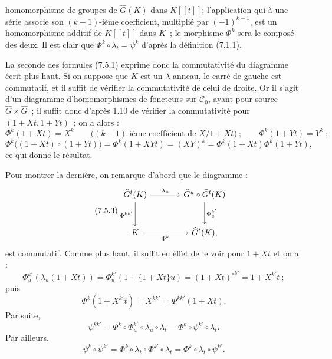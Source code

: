 homomorphisme de groupes de \(\widehat G(K)\) dans \(K[[t]]\); l'application qui à une série associe son \((k-1)\)-ième coefficient, multiplié par \((-1)^{k-1}\), est un homomorphisme additif de \(K[[t]]\) dans \(K\)~; le morphisme \(\Phi^k\) sera le composé des deux. Il est clair que \(\Phi^k\circ\lambda_t=\psi^k\) d'après la définition (7.1.1).

La seconde des formules (7.5.1) exprime donc la commutativité du diagramme écrit plus haut. Si on suppose que \(K\) est un \(\lambda\)-anneau, le carré de gauche est commutatif, et il suffit de vérifier la commutativité de celui de droite. Or il s'agit d'un diagramme d'homomorphismes de foncteurs sur \(\mathcal C_0\), ayant pour source \(\widehat G\times\widehat G\)~; il suffit donc d'après 1.10 de vérifier la commutativité pour \((1+Xt,1+Yt)\)~; on a alors :
\[
  \Phi^k(1+Xt)=X^k\qquad\bigl(\text{$(k-1)$-ième coefficient de }X/1+Xt\bigr)~;\qquad
  \Phi^k(1+Yt)=Y^k~;
\]
\[
  \Phi^k\bigl((1+Xt)\circ(1+Yt)\bigr)
  =
  \Phi^k(1+XYt)
  =
  (XY)^k
  =
  \Phi^k(1+Xt)\Phi^k(1+Yt),
\]
ce qui donne le résultat.

Pour montrer la dernière, on remarque d'abord que le diagramme :
\begin{equation}\tag{7.5.3}
\begin{tikzcd}[column sep=large,row sep=large]
\widehat G^t(K) \arrow[r,"\lambda_u"] \arrow[d,"\Phi^{kk'}"'] &
\widehat G^u\circ\widehat G^t(K) \arrow[d,"\Phi^{k'}_u"]\\
K \arrow[r,"\Phi^k"'] &
\widehat G^t(K),
\end{tikzcd}
\end{equation}
est commutatif. Comme plus haut, il suffit en effet de le voir pour \(1+Xt\) et on a :
\[
  \Phi^{k'}_u(\lambda_u(1+Xt))
  =
  \Phi^{k'}_u(1+\{1+Xt\}u)
  =
  (1+Xt)^{\circ k'}
  =
  1+X^{k'}t~;
\]
puis
\[
  \Phi^k(1+X^{k'}t)=X^{kk'}=\Phi^{kk'}(1+Xt).
\]
Par suite,
\[
  \psi^{kk'}
  =
  \Phi^k\circ\Phi^{k'}_u\circ\lambda_u\circ\lambda_t
  =
  \Phi^k\circ\psi^{k'}\circ\lambda_t.
\]
Par ailleurs,
\[
  \psi^k\circ\psi^{k'}
  =
  \Phi^k\circ\lambda_t\circ\Phi^{k'}\circ\lambda_t
  =
  \Phi^k\circ\lambda_t\circ\psi^{k'}.
\]
